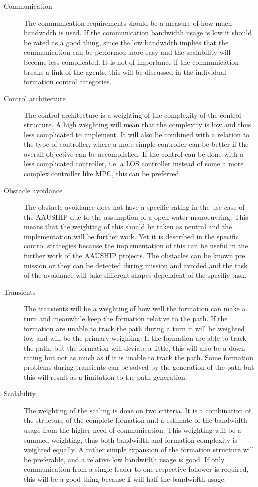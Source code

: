 \begin{description}
\item[Communication] The communication requirements should be a measure of how much bandwidth is used. If the communication bandwidth usage is low it should be rated as a good thing, since the low bandwidth implies that the communication can be performed more easy and the scalability will become less complicated. It is not of importance if the communication breaks a link of the agents, this will be discussed in the individual formation control categories.

\item[Control architecture] The control architecture is a weighting of the complexity of the control structure. A high weighting will mean that the complexity is low and thus less complicated to implement. It will also be combined with a relation to the type of controller, where a more simple controller can be better if the overall objective can be accomplished. If the control can be done with a less complicated controller, i.e. a \ac{LOS} controller instead of some a more complex controller like \ac{MPC}, this can be preferred.

\item[Obstacle avoidance] The obstacle avoidance does not have a specific rating in the use case of the AAUSHIP due to the assumption of a open water manoeuvring. This means that the weighting of this should be taken as neutral and the implementation will be further work. Yet it is described in the specific control strategies because the implementation of this can be useful in the further work of the AAUSHIP projects. The obstacles can be known pre mission or they can be detected during mission and avoided and the task of the avoidance will take different shapes dependent of the specific task.

\item[Transients] The transients will be a weighting of how well the formation can make a turn and meanwhile keep the formation relative to the path. If the formation are unable to track the path during a turn it will be weighted low and will be the primary weighting. If the formation are able to track the path, but the formation will deviate a little, this will also be a down rating but not as much as if it is unable to track the path. Some formation problems during transients can be solved by the generation of the path but this will result as a limitation to the path generation.

\item[Scalability] The weighting of the scaling is done on two criteria. It is a combination of the structure of the complete formation and a estimate of the bandwidth usage from the higher need of communication. This weighting will be a summed weighting, thus both bandwidth and formation complexity is weighted equally. A rather simple expansion of the formation structure will be preferable, and a relative low bandwidth usage is good. If only communication from a single leader to one respective follower is required, this will be a good thing because if will half the bandwidth usage.
\end{description}

